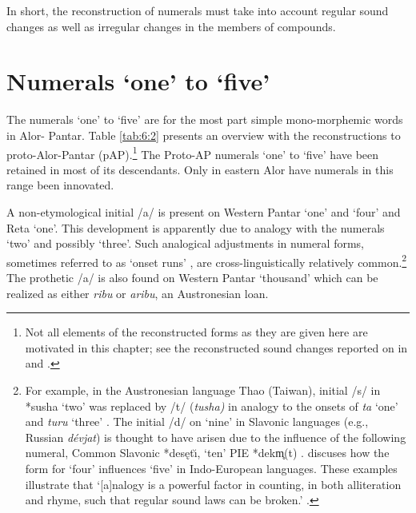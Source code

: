 In short, the reconstruction of numerals must take into account regular sound changes as well as irregular changes in the members of compounds. 

\section{Numerals `one' to `five'}\label{sec:6:4}
The numerals `one' to `five' are for the most part simple mono-morphemic words in Alor- Pantar. Table \ref{tab:6:2} presents an overview with the reconstructions to proto-Alor-Pantar (pAP).\footnote{Not all elements of the reconstructed forms as they are given here are motivated in this chapter; see the reconstructed sound changes reported on in \citet{HoltonEtAl2012} and \citet{HoltonRobinsonTVhistory}.}  The Proto-AP numerals `one' to `five' have been retained in most of its descendants. Only in eastern Alor have numerals in this range been innovated. 
 
A non-etymological initial /a/ is present on Western Pantar `one' and `four' and Reta `one'. This development is apparently due to analogy with the numerals `two' and possibly `three'. Such analogical adjustments in numeral forms, sometimes referred to as `onset runs' \citep{Matisoff1995}, are cross-linguistically relatively common.\footnote{For example, in the Austronesian language Thao (Taiwan), initial /s/ in *susha `two' was replaced by /t/ (\textit{tusha)} in analogy to the onsets of \textit{ta} `one' and \textit{turu} `three' \citep[274]{Blust2009}. The initial /d/ on `nine' in Slavonic languages (e.g., Russian \textit{d\'evjat}) is thought to have arisen due to the influence of the following numeral, Common Slavonic *des\k{e}t\u{\i}, `ten' PIE *dekm̥(t) \citep[760]{Comrie1992}. \citet{Winter1969} discuses how the form for `four' influences `five' in Indo-European languages. These examples illustrate that `[a]nalogy is a powerful factor in counting, in both alliteration and rhyme, such that regular sound laws can be broken.' \citep[256]{Sidwell1999}.} The prothetic /a/ is also found on Western Pantar `thousand' which can be realized as either \textit{ribu} or \textit{aribu}, an Austronesian loan. 


